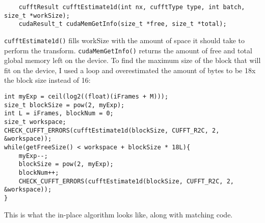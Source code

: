 \begin{verbatim}
    cufftResult cufftEstimate1d(int nx, cufftType type, int batch, size_t *workSize);
    cudaResult_t cudaMemGetInfo(size_t *free, size_t *total);
\end{verbatim}

\verb|cufftEstimate1d()| fills workSize with the amount of space it should take to perform the transform. \verb|cudaMemGetInfo()| returns the amount of free and total global memory left on the device. To find the maximum size of the block that will fit on the device, I used a loop and overestimated the amount of bytes to be 18x the block size instead of 16:

\begin{verbatim}
int myExp = ceil(log2((float)(iFrames + M)));
size_t blockSize = pow(2, myExp);
int L = iFrames, blockNum = 0;
size_t workspace;
CHECK_CUFFT_ERRORS(cufftEstimate1d(blockSize, CUFFT_R2C, 2, &workspace));
while(getFreeSize() < workspace + blockSize * 18L){
	myExp--;
	blockSize = pow(2, myExp);
	blockNum++;
	CHECK_CUFFT_ERRORS(cufftEstimate1d(blockSize, CUFFT_R2C, 2, &workspace));
}
\end{verbatim}

This is what the in-place algorithm looks like, along with matching code.

\def\excerpt{\thispagestyle{empty} \paragraph{In-Place Overlap-Add Algorithm} \hspace{0pt} \\}


